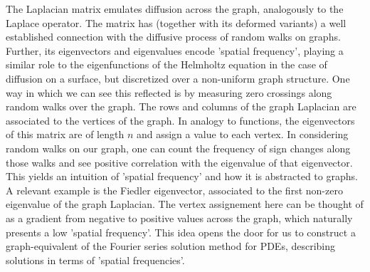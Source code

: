 \documentclass[%
 aip,
 amsmath,amssymb,
preprint,
reprint, onecolumn %
]{revtex4-1}
\begin{document}
The Laplacian matrix emulates diffusion across the graph, analogously to the Laplace operator.\cite{belkin2008towards} The matrix has (together with its deformed variants) a well established connection with the diffusive process of random walks on graphs.\cite{Seabrooketal_Markov_Spectral,boukrab_random-walk_2021} 
Further, its eigenvectors and eigenvalues encode 'spatial frequency', playing a similar role to the eigenfunctions of the Helmholtz equation in the case of diffusion on a surface, but discretized over a non-uniform graph structure. One way in which we can see this reflected is by measuring zero crossings along random walks over the graph.\cite{shuman_emerging_2013} The rows and columns of the graph Laplacian are associated to the vertices of the graph. In analogy to functions, the eigenvectors of this matrix are of length $n$ and assign a value to each vertex. In considering random walks on our graph, one can count the frequency of sign changes along those walks and see positive correlation with the eigenvalue of that eigenvector.\cite{shuman_emerging_2013} This yields an intuition of 'spatial frequency' and how it is abstracted to graphs. 
A relevant example is the Fiedler eigenvector, associated to the first non-zero eigenvalue of the graph Laplacian. The vertex assignement here can be thought of as a gradient from negative to positive values across the graph, which naturally presents a low 'spatial frequency'.
This idea opens the door for us to construct a graph-equivalent of the Fourier series solution method for PDEs, describing solutions in terms of 'spatial frequencies'.\cite{shuman_emerging_2013}
\end{document}
